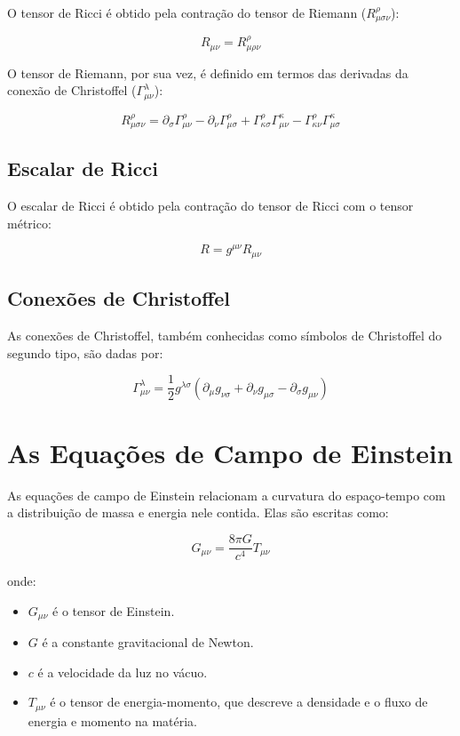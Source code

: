 \documentclass[a4paper,12pt]{article}
\begin{document}
O tensor de Ricci é obtido pela contração do tensor de Riemann ($R^\rho_{\mu\sigma\nu}$):

$$R_{\mu\nu} = R^\rho_{\mu\rho\nu}$$

O tensor de Riemann, por sua vez, é definido em termos das derivadas da conexão de Christoffel ($\Gamma^\lambda_{\mu\nu}$):

$$R^\rho_{\mu\sigma\nu} = \partial_\sigma \Gamma^\rho_{\mu\nu} - \partial_\nu \Gamma^\rho_{\mu\sigma} + \Gamma^\rho_{\kappa\sigma} \Gamma^\kappa_{\mu\nu} - \Gamma^\rho_{\kappa\nu} \Gamma^\kappa_{\mu\sigma}$$

\subsection{Escalar de Ricci}

O escalar de Ricci é obtido pela contração do tensor de Ricci com o tensor métrico:

$$R = g^{\mu\nu}R_{\mu\nu}$$

\subsection{Conexões de Christoffel}

As conexões de Christoffel, também conhecidas como símbolos de Christoffel do segundo tipo, são dadas por:

$$\Gamma^\lambda_{\mu\nu} = \frac{1}{2} g^{\lambda\sigma} \left( \partial_\mu g_{\nu\sigma} + \partial_\nu g_{\mu\sigma} - \partial_\sigma g_{\mu\nu} \right)$$

\section{As Equações de Campo de Einstein}

As equações de campo de Einstein relacionam a curvatura do espaço-tempo com a distribuição de massa e energia nele contida. Elas são escritas como:

$$G_{\mu\nu} = \frac{8\pi G}{c^4} T_{\mu\nu}$$

onde:
\begin{itemize}
	\item $G_{\mu\nu}$ é o tensor de Einstein.
	\item $G$ é a constante gravitacional de Newton.
	\item $c$ é a velocidade da luz no vácuo.
	\item $T_{\mu\nu}$ é o tensor de energia-momento, que descreve a densidade e o fluxo de energia e momento na matéria.
\end{itemize}
\end{document}
